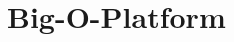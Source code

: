 \chapter{Big-\/\+O-\/\+Platform}
\hypertarget{md__r_e_a_d_m_e}{}\label{md__r_e_a_d_m_e}
\label{md__r_e_a_d_m_e_autotoc_md0}%
%
